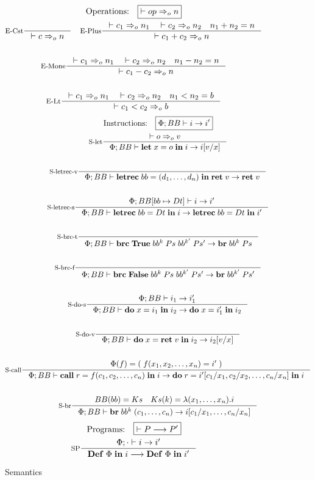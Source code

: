 \documentclass[a4paper, oneside, 10pt, draft]{memoir}
\begin{document}
\begin{figure}
  \begin{gather*}
    \text{Operations:} \quad \boxed{|- op \eop n}\\
    \inference[E-Cst]{}{|- c \eop n} \quad
    \inference[E-Plus]{|- c_1 \eop n_1 \quad |- c_2 \eop n_2 \quad
      n_1 + n_2 = n}{|- c_1 + c_2 \eop n}\\\\
    \inference[E-Mone]{|- c_1 \eop n_1 \quad |- c_2 \eop n_2 \quad
      n_1 - n_2 = n}{|- c_1 - c_2 \eop n}\\\\
    \inference[E-Lt]{|- c_1 \eop n_1 \quad |- c_2 \eop n_2 \quad
      n_1 < n_2 = b}{|- c_1  < c_2 \eop b}
  \end{gather*}
  \begin{gather*}
    \text{Instructions:} \quad \boxed{\Phi;BB |- i -> i'}\\
    \inference[S-let]{|- o \eop v}{\Phi;BB |- \ilet{x}{o}{i} ->
      i[v/x]}\\\\
    \inference[S-letrec-v]{}{\Phi;BB |- \iletrec{bb}{(d_1, \dotsc,
        d_n)}{\iret{v}} -> \iret{v}}\\\\
    \inference[S-letrec-s]{\Phi;BB[bb \mapsto Dt] |- i -> i'}
    {\Phi;BB |- \iletrec{bb}{Dt}{i} -> \iletrec{bb}{Dt}{i'}}\\\\
    \inference[S-brc-t]{}{\Phi;BB |-
      \ibrc{\btrue}{bb^k}{Ps}{bb^{k'}}{Ps'} -> \ibr{bb^k}{Ps}}\\\\
    \inference[S-brc-f]{}{\Phi;BB |-
      \ibrc{\bfalse}{bb^k}{Ps}{bb^{k'}}{Ps'} ->
      \ibr{bb^{k'}}{Ps'}}\\\\
    \inference[S-do-s]{\Phi;BB |- i_1 -> i'_1}{\Phi;BB |-
      \ido{x}{i_1}{i_2} -> \ido{x}{i'_1}{i_2}}\\\\
    \inference[S-do-v]{}{\Phi;BB |- \ido{x}{\iret v}{i_2} ->
      i_2[v/x]}\\\\
    \inference[S-call]{\Phi(f) = (\;f(x_1, x_2, \dotsc, x_n) = i'\;)}{\Phi;BB |-
      \icall{r}{f}{(c_1, c_2, \dotsc, c_n)}{i} -> \ido{r}{i'[c_1/x_1, c_2/x_2,
        \dotsc, c_n/x_n]}{i}}\\\\
    \inference[S-br]{BB(bb) = Ks \quad Ks(k) = \lambda(x_1, \dotsc, x_n).i}{\Phi;BB |- \ibr{bb^k}{(c_1, \dotsc, c_n)} ->
      i[c_1/x_1, \dotsc, c_n/x_n]}
 \end{gather*}
 \begin{gather*}
   \text{Programs:} \quad \boxed{|- P --> P'}\\
   \inference[SP]{\Phi;\cdot |- i -> i'}{\ipgm{\Phi}{i} --> \ipgm{\Phi}{i'}}
 \end{gather*}
  \caption{Semantics}
  \label{fig:semantics}
\end{figure}
\end{document}
